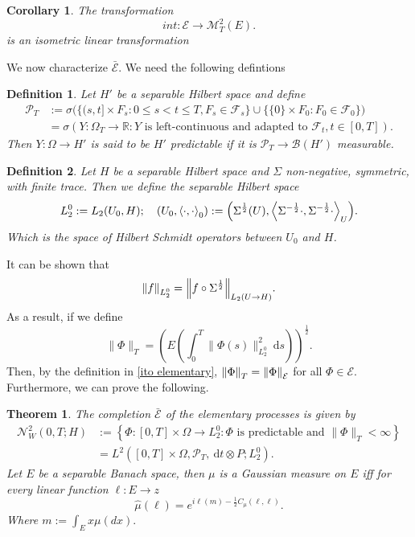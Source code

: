 \documentclass[12pt]{article}
\newcommand{\br}[1]{\left\langle#1\right\rangle}
\newcommand{\R}zzzzz
\newtheorem{theorem}{Theorem}
\newtheorem{definition}{Definition}
\newtheorem{corollary}{Corollary}
\begin{document}
\begin{corollary}
	The transformation
	\begin{equation*}
		int:\mathcal{E}\to \mathcal{M}_T^2(E).
	\end{equation*}
	is an isometric linear transformation
\end{corollary}
We now characterize $\bar{\mathcal{E}}$. We need the following defintions
\begin{definition}
	Let $H'$ be a separable Hilbert space and define
	\begin{align*}
		\mathcal{P}_{T} & :=\sigma\Big(\big\{(s, t] \times F_{s} :0 \leq s<t \leq T, F_{s} \in \mathcal{F}_{s}\big\} \cup\big\{\{0\} \times F_{0} :F_{0} \in \mathcal{F}_{0}\big\}\Big) \\
		                & =\sigma(Y: \Omega_{T} \rightarrow \mathbb{R} :Y \text { is left-continuous and adapted to }
		\mathcal{F}_{t}, t \in[0, T]) .
	\end{align*}
	Then $Y:\Omega\to H'$ is said to be $H'$ predictable if it is $\mathcal{P}_T\to\mathcal{B}(H')$ measurable.
\end{definition}
\begin{definition}
	Let $H$ be a separable Hilbert space and $\Sigma$ non-negative, symmetric, with finite trace. Then we define the separable Hilbert space
	\begin{equation*}
		L_2^0:=L_2(U_0,H);\quad (U_0,\br{\cdot,\cdot}_0):=\qty(\Sigma^{\frac{1}{2}}(U),\br{\Sigma^{-\frac{1}{2}}\cdot,\Sigma^{-\frac{1}{2}}\cdot}_U).
	\end{equation*}
	Which is the space of Hilbert Schmidt operators between $U_0$ and $H$.
\end{definition}
It can be shown that
\begin{equation*}
	\norm{f}_{L_{2}^{0}}=\norm{f\circ \Sigma^\frac{1}{2}}_{L_2(U\to H)}.
\end{equation*}
As a result, if we define
\begin{equation*}
	\|\Phi\|_{T}=\left(E\left(\int_{0}^{T}\|\Phi(s)\|_{L_{2}^{0}}^{2} \mathrm{~d} s\right)\right)^{\frac{1}{2}}.
\end{equation*}
Then, by the definition in \ref{ito elementary}, $\norm{\Phi}_T=\norm{\Phi}_\mathcal{E}$ for all $\Phi\in\mathcal{E}$. Furthermore, we can prove the following.
\begin{theorem}
	The completion $\bar{\mathcal{E}}$ of the elementary processes is given by
	\begin{align*}
		\mathcal{N}_{W}^{2}(0, T ; H) & :=\left\{\Phi:[0, T] \times \Omega \rightarrow L_{2}^{0} :\Phi \text { is predictable and }\|\Phi\|_{T}<\infty\right\} \\
		                              & =L^{2}\left([0, T] \times \Omega, \mathcal{P}_{T}, \mathrm{~d} t \otimes P ; L_{2}^{0}\right) .
	\end{align*}
	Let $E$ be a separable Banach space, then $\mu $ is a Gaussian measure on $E$ iff for every linear function  $\ell :E\to\R$
	\begin{equation*}
		\hat{\mu }(\ell )=e^{i\ell(m)-\frac{1}{2}C_\mu (\ell ,\ell )}.
	\end{equation*}
	Where
	$    	m:=\int_{E}x \mu (dx).
	$
\end{theorem}

\end{document}

